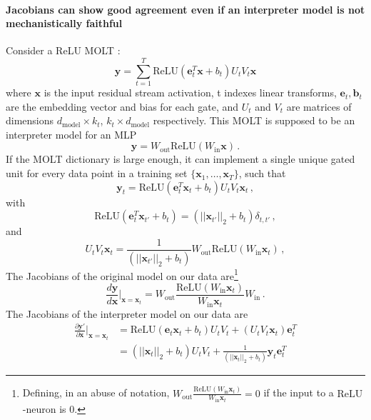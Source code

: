 \documentclass{article}
\begin{document}
\paragraph{Jacobians can show good agreement even if an interpreter model is not mechanistically faithful}
Consider a ReLU MOLT \citep{lindsey2025molts}:
\begin{equation}
\mathbf{y}=\sum^T_{t=1}\text{ReLU}(\mathbf{e}^T_t \mathbf{x}+b_t) U_t V_t \mathbf{x}
\end{equation}
where $\mathbf{x}$ is the input residual stream activation, t indexes linear transforms, $\mathbf{e}_t, \mathbf{b}_t$ are the embedding vector and bias for each gate, and $U_t$ and $V_t$ are matrices of dimensions $d_{\text{model}} \times k_t$, $k_t \times d_{\text{model}}$ respectively. This MOLT is supposed to be an interpreter model for an MLP
\begin{equation}
\mathbf{y}=W_{\text{out}}\text{ReLU}(W_{\text{in}}\mathbf{x})\,.
\end{equation}
If the MOLT dictionary is large enough, it can implement a single unique gated unit for every data point in a training set $\{\mathbf{x}_1,\dots, \mathbf{x}_T\}$, such that 
\begin{equation}
\mathbf{y}_t=\text{ReLU}(\mathbf{e}^T_t \mathbf{x}_t+b_t)U_t V_t\mathbf{x}_t\,,
\end{equation}
with 
\begin{equation}
\text{ReLU}(\mathbf{e}^T_t \mathbf{x}_{t'}+b_t)=(\vert\vert\mathbf{x}_{t'}\vert\vert_2+b_t)\delta_{t,t'}\,,
\end{equation}
and 
\begin{equation}
U_t V_t\mathbf{x}_t=\frac{1}{(\vert\vert\mathbf{x}_{t'}\vert\vert_2+b_t)}W_{\text{out}}\text{ReLU}(W_{\text{in}}\mathbf{x}_t)\,,
\end{equation}
The Jacobians of the original model on our data are\footnote{Defining, in an abuse of notation, $W_{\text{out}}\frac{\text{ReLU}(W_{\text{in}}\mathbf{x}_t)}{W_{\text{in}} \mathbf{x}_t}=0$ if the input to a $\text{ReLU}$-neuron is $0$.}
\begin{equation}
\frac{d\mathbf{y}}{d\mathbf{x}}\vert_{\mathbf{x}=\mathbf{x}_t}=W_{\text{out}}\frac{\text{ReLU}(W_{\text{in}}\mathbf{x}_t)}{W_{\text{in}}\mathbf{x}_t} W_{\text{in}}\,.
\end{equation}
The Jacobians of the interpreter model on our data are
\begin{equation}
\begin{aligned}
\frac{\partial\mathbf{y'}}{\partial\mathbf{x}}\vert_{\mathbf{x}=\mathbf{x}_t}&=\text{ReLU}(\mathbf{e}_t \mathbf{x}_t+b_t)U_t V_t+(U_t V_t\mathbf{x}_t) \mathbf{e}^T_t\\
&=(\vert\vert\mathbf{x}_{t}\vert\vert_2+b_t)U_t V_t+\frac{1}{(\vert\vert\mathbf{x}_{t}\vert\vert_2+b_t)}\mathbf{y}_t \mathbf{e}^T_t
\end{aligned}
\end{equation}
\end{document}

